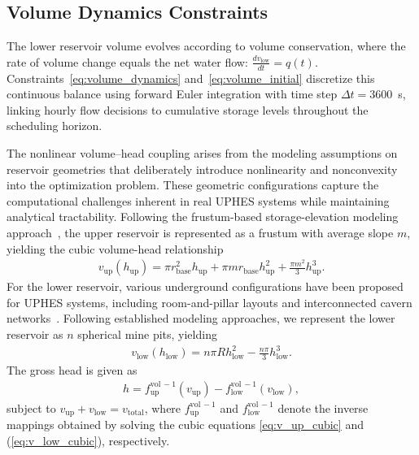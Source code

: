 \documentclass[journal]{IEEEtran}
\begin{document}
\subsection{Volume Dynamics Constraints}
\label{sec:volume_constraints}

The lower reservoir volume evolves according to volume conservation, where the rate of volume change equals the net water flow: $\frac{dv_{\text{low}}}{dt}=q(t)$. Constraints~\eqref{eq:volume_dynamics} and~\eqref{eq:volume_initial} discretize this continuous balance using forward Euler integration with time step $\Delta t = 3600$~s, linking hourly flow decisions to cumulative storage levels throughout the scheduling horizon.

The nonlinear volume–head coupling arises from the modeling assumptions on reservoir geometries that deliberately introduce nonlinearity and nonconvexity into the optimization problem. These geometric configurations capture the computational challenges inherent in real UPHES systems while maintaining analytical tractability. Following the frustum-based storage-elevation modeling approach~\cite{liu2022low}, the upper reservoir is represented as a frustum with average slope $m$, yielding the cubic volume-head relationship
\begin{align}
v_{\text{up}}(h_{\text{up}}) = \pi r_{\text{base}}^2 h_{\text{up}} + \pi m r_{\text{base}} h_{\text{up}}^2 + \frac{\pi m^2}{3} h_{\text{up}}^3. \label{eq:v_up_cubic}
\end{align}
For the lower reservoir, various underground configurations have been proposed for UPHES systems, including room-and-pillar layouts and interconnected cavern networks~\cite{allen1984underground}. Following established modeling approaches, we represent the lower reservoir as $n$ spherical mine pits, yielding 
\begin{align}
v_{\text{low}}(h_{\text{low}}) = n\pi R h_{\text{low}}^2 - \frac{n\pi}{3} h_{\text{low}}^3.\label{eq:v_low_cubic}
\end{align}
The gross head is given as 
\begin{align}
h = f_{\text{up}}^{\text{vol}\,-1}(v_{\text{up}}) - f_{\text{low}}^{\text{vol}\,-1}(v_{\text{low}}), \label{eq:head_vol_relation}
\end{align}
subject to $v_{\text{up}} + v_{\text{low}} = v_{\text{total}}$, where $f_{\text{up}}^{\text{vol}\,-1}$ and $f_{\text{low}}^{\text{vol}\,-1}$ denote the inverse mappings obtained by solving the cubic equations \eqref{eq:v_up_cubic} and (\ref{eq:v_low_cubic}), respectively.
\end{document}
